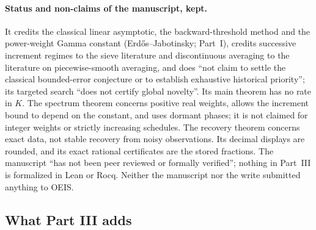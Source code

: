 \paragraph{Status and non-claims of the manuscript, kept.} It credits the
classical linear asymptotic, the backward-threshold method and the
power-weight Gamma constant (Erd\H{o}s--Jabotinsky; Part~I), credits
successive increment regimes to the sieve literature and discontinuous
averaging to the literature on piecewise-smooth averaging, and does ``not
claim to settle the classical bounded-error conjecture or to establish
exhaustive historical priority''; its targeted search ``does not certify
global novelty''. Its main theorem has no rate in $K$. The spectrum theorem
concerns positive real weights, allows the increment bound to depend on the
constant, and uses dormant phases; it is not claimed for integer weights
or strictly increasing schedules. The recovery theorem concerns exact data,
not stable recovery from noisy observations. Its decimal displays are
rounded, and its exact rational certificates are the stored fractions. The
manuscript ``has not been peer reviewed or formally verified''; nothing in
Part~III is formalized in Lean or Rocq. Neither the manuscript nor the
write submitted anything to OEIS.

\subsection{What Part III adds}\label{rex:sch:sec:adds}


